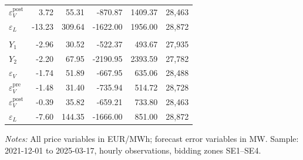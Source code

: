 \documentclass{article}
\begin{document}
\begin{table}[htbp]
\begin{threeparttable}
\begin{tabularx}{\linewidth}{>{\raggedright\arraybackslash}Xrrrrr}
$\varepsilon_V^{\mathrm{post}}$ &     3.72 &    55.31 &    -870.87 &    1409.37 & 28,463 \\
$\varepsilon_L$ &   -13.23 &   309.64 &   -1622.00 &    1956.00 & 28,872 \\
\addlinespace
\multicolumn{6}{l}{\textit{SE4 --- Southern Sweden}} \\
\addlinespace[0.3ex]
$Y_1$ &    -2.96 &    30.52 &    -522.37 &     493.67 & 27,935 \\
$Y_2$ &    -2.20 &    67.95 &   -2190.95 &    2393.59 & 27,782 \\
$\varepsilon_V$ &    -1.74 &    51.89 &    -667.95 &     635.06 & 28,488 \\
$\varepsilon_V^{\mathrm{pre}}$ &    -1.48 &    31.40 &    -735.94 &     514.72 & 28,728 \\
$\varepsilon_V^{\mathrm{post}}$ &    -0.39 &    35.82 &    -659.21 &     733.80 & 28,463 \\
$\varepsilon_L$ &    -7.60 &   144.35 &   -1666.00 &     851.00 & 28,872 \\
\bottomrule
\end{tabularx}
\begin{tablenotes}[flushleft]
\footnotesize
\item \textit{Notes:} All price variables in EUR/MWh; forecast error variables in MW. Sample: 2021-12-01 to 2025-03-17, hourly observations, bidding zones SE1--SE4.
\end{tablenotes}
\end{threeparttable}
\end{table}
\end{document}
